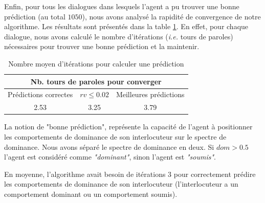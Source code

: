 	Enfin, pour tous les dialogues dans lesquels l'agent a pu trouver une bonne prédiction (au total $ 1050 $), nous avons analysé la rapidité de convergence de notre algorithme. Les résultats sont présentés dans la table \ref {tab:conv}. En effet, pour chaque dialogue, nous avons calculé le nombre d'itérations (\emph{i.e.} tours de paroles) nécessaires pour trouver une bonne prédiction et la maintenir. 
	
	
	\begin{table}[h]
		\centering
		
		\caption{Nombre moyen d'itérations pour calculer une prédiction} 
		\begin{tabular}{|c|c|c|}
			\hline
			\multicolumn{3}{|c|}{Nb. tours de paroles pour converger} \\
			\hline
			Prédictions correctes & $rv \leq 0.02$ & Meilleures prédictions \\
			\hline
			2.53 & 3.25 & 3.79\\
			\hline
		\end{tabular}
		
		\label{tab:conv}
	\end{table}
	
	La notion de "bonne prédiction", représente la capacité de l'agent à positionner les comportements de dominance de son interlocuteur sur le spectre de dominance. Nous avons séparé le spectre de dominance en deux. Si $dom > 0.5$ l'agent est considéré comme \emph{"dominant"}, sinon l'agent est \emph{"soumis"}.
	
	
	En moyenne, l'algorithme avait besoin de itérations $3$ pour correctement prédire les comportements de dominance de son interlocuteur (l'interlocuteur a un comportement dominant ou un comportement soumis). 
	
